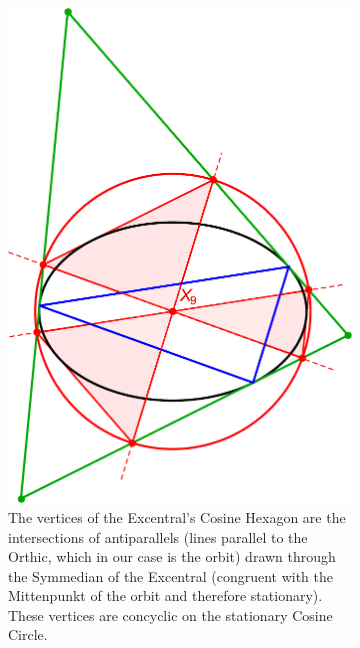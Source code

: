 \begin{figure}[H]
     \centering
     \begin{subfigure}[t]{0.45\textwidth}
         \centering
          \includegraphics[width=1.0\linewidth]{pics/0130_cosine_hexagon.pdf}
         \caption{The vertices of the Excentral's Cosine Hexagon are the intersections of antiparallels (lines parallel to the Orthic, which in our case is the orbit) drawn through the Symmedian of the Excentral (congruent with the Mittenpunkt of the orbit and therefore stationary). These vertices are concyclic on the stationary Cosine Circle.}
     \label{fig:cosine_hexagon}
     \end{subfigure}
    \hfill
     \begin{subfigure}[t]{0.45\textwidth}
         \centering

\end{subfigure}
\end{figure}

